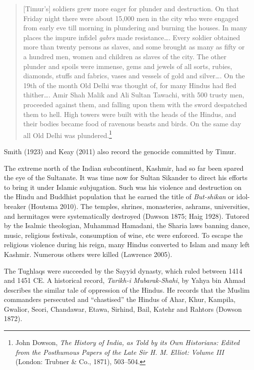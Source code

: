 \begin{quote}
[Timur's] soldiers grew more eager for plunder and destruction. On that Friday night there were about 15,000 men in the city who were engaged from early eve till morning in plundering and burning the houses. In many places the impure infidel \textit{gabrs} made resistance…. Every soldier obtained more than twenty persons as slaves, and some brought as many as fifty or a hundred men, women and children as slaves of the city. The other plunder and spoils were immense, gems and jewels of all sorts, rubies, diamonds, stuffs and fabrics, vases and vessels of gold and silver…. On the 19th of the month Old Delhi was thought of, for many Hindus had fled thither…. Amir Shah Malik and Ali Sultan Tawachi, with 500 trusty men, proceeded against them, and falling upon them with the sword despatched them to hell. High towers were built with the heads of the Hindus, and their bodies became food of ravenous beasts and birds. On the same day all Old Delhi was plundered.\footnote{John Dowson, \textit{The History of India, as Told by its Own Historians: Edited from the Posthumous Papers of the Late Sir H. M. Elliot: Volume III} (London: Trubner \& Co., 1871), 503--504.} 
\end{quote}
Smith (1923) and Keay (2011) also record the genocide committed by Timur. 

The extreme north of the Indian subcontinent, Kashmir, had so far been spared the eye of the Sultanate. It was time now for Sultan Sikander to direct his efforts to bring it under Islamic subjugation. Such was his violence and destruction on the Hindu and Buddhist population that he earned the title of \textit{But-shikan} or idol-breaker (Houtsma 2010). The temples, shrines, monasteries, ashrams, universities, and hermitages were systematically destroyed (Dawson 1875; Haig 1928). Tutored by the Isalmic theologian, Muhammad Hamadani, the Sharia laws banning dance, music, religious festivals, consumption of wine, etc were enforced. To escape the religious violence during his reign, many Hindus converted to Islam and many left Kashmir. Numerous others were killed (Lawrence 2005).

The Tughlaqs were succeeded by the Sayyid dynasty, which ruled between 1414 and 1451 CE. A historical record, \textit{Tarikh-i Mubarak-Shahi}, by Yahya bin Ahmad describes the similar tale of oppression of the Hindus. He records that the Muslim commanders persecuted and “chastised” the Hindus of Ahar, Khur, Kampila, Gwalior, Seori, Chandawar, Etawa, Sirhind, Bail, Katehr and Rahtors (Dowson 1872).

